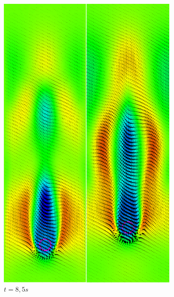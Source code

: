 \begin{figure}[H]
	\centering
	\ContinuedFloat
	\begin{subfigure}[ht!]{0.3\textwidth}
		\centering
		\includegraphics[width=1\textwidth]{compare_CL/t=8,5s.png}
		\caption{$t=8,5s$}
	\end{subfigure}
	\begin{subfigure}[ht!]{0.3\textwidth}
		\centering

\end{subfigure}
\end{figure}
